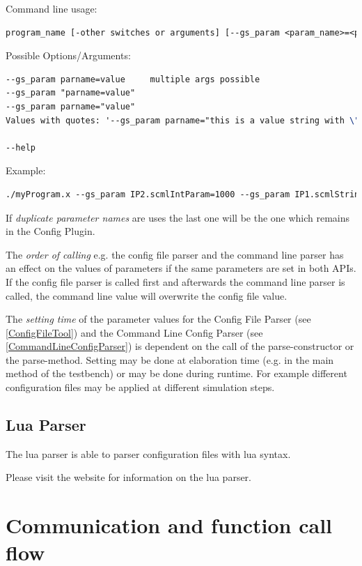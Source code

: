 Command line usage:
\begin{lstlisting}[language=TeX]
program_name [-other switches or arguments] [--gs_param <param_name>=<param_value>]* [others]
\end{lstlisting}

Possible Options/Arguments:
\begin{lstlisting}[language=TeX]
--gs_param parname=value     multiple args possible
--gs_param "parname=value"
--gs_param parname="value"
Values with quotes: '--gs_param parname="this is a value string with \"quotes\""

--help
\end{lstlisting}

Example:
\begin{lstlisting}[language=TeX]
./myProgram.x --gs_param IP2.scmlIntParam=1000 --gs_param IP1.scmlStringParam=testValueString --gs_param IP3.stringPar="This is a string with \"quotes\" and spaces"
\end{lstlisting}

If \emph{duplicate parameter names} are uses the last one will be the one which remains in the Config Plugin.

The \emph{order of calling} e.g. the config file parser and the command line parser has an effect on the values of parameters if the same parameters
are set in both APIs. If the config file parser is called first and afterwards the command line parser is called, the command line value will overwrite the config file value.

The \emph{setting time} of the parameter values for the Config File Parser (see \ref{ConfigFileTool}) and the Command Line Config Parser (see \ref{CommandLineConfigParser}) is dependent on the call of the parse-constructor or the parse-method. Setting may be done at elaboration time (e.g. in the main method of the testbench) or may be done during runtime. For example different configuration files may be applied at different simulation steps.


\subsection{Lua Parser}
\label{LuaParser}

The lua parser is able to parser configuration files with lua syntax.

Please visit the website for information on the lua parser.

\section{Communication and function call flow}

